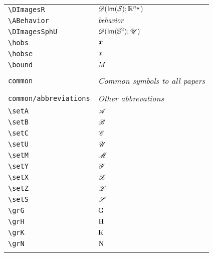 \begin{longtable}{lll}
 {\color[rgb]{0.5,0.5,0.5}\texttt{\textbackslash DImagesR}} & $\DImagesR$ & \\ 
 {\color[rgb]{0.5,0.5,0.5}\texttt{\textbackslash ABehavior}} & $\textit{behavior}$ & \\ 
 {\color[rgb]{0.5,0.5,0.5}\texttt{\textbackslash DImagesSphU}} & $\mathscr{D}(\mathsf{Im}(\mathbb{S}^2);\mathscr{U})$ & \\ 
 {\color[rgb]{0.5,0.5,0.5}\texttt{\textbackslash hobs}} & $\boldsymbol{x}$ & \\ 
 {\color[rgb]{0.5,0.5,0.5}\texttt{\textbackslash hobse}} & $x$ & \\ 
 {\color[rgb]{0.5,0.5,0.5}\texttt{\textbackslash bound}} & $M$ & \\ 
  &  & \\ 
 {\color[rgb]{0.5,0.5,0.5}\texttt{common}} & \multicolumn{2}{l}{\emph{Common symbols to all papers}}\\ 
 \hline
\hline
 &  & \\ 
 {\color[rgb]{0.5,0.5,0.5}\texttt{common/abbreviations}} & \multicolumn{2}{l}{\emph{Other abbrevations}}\\ 
 \hline
{\color[rgb]{0.5,0.5,0.5}\texttt{\textbackslash setA}} & $\mathscr{A}$ & \\ 
 {\color[rgb]{0.5,0.5,0.5}\texttt{\textbackslash setB}} & $\mathscr{B}$ & \\ 
 {\color[rgb]{0.5,0.5,0.5}\texttt{\textbackslash setC}} & $\mathscr{C}$ & \\ 
 {\color[rgb]{0.5,0.5,0.5}\texttt{\textbackslash setU}} & $\mathscr{U}$ & \\ 
 {\color[rgb]{0.5,0.5,0.5}\texttt{\textbackslash setM}} & $\mathscr{M}$ & \\ 
 {\color[rgb]{0.5,0.5,0.5}\texttt{\textbackslash setY}} & $\mathscr{Y}$ & \\ 
 {\color[rgb]{0.5,0.5,0.5}\texttt{\textbackslash setX}} & $\mathscr{X}$ & \\ 
 {\color[rgb]{0.5,0.5,0.5}\texttt{\textbackslash setZ}} & $\mathscr{Z}$ & \\ 
 {\color[rgb]{0.5,0.5,0.5}\texttt{\textbackslash setS}} & $\mathscr{S}$ & \\ 
 {\color[rgb]{0.5,0.5,0.5}\texttt{\textbackslash grG}} & $\mathrm{G}$ & \\ 
 {\color[rgb]{0.5,0.5,0.5}\texttt{\textbackslash grH}} & $\mathrm{H}$ & \\ 
 {\color[rgb]{0.5,0.5,0.5}\texttt{\textbackslash grK}} & $\mathrm{K}$ & \\ 
 {\color[rgb]{0.5,0.5,0.5}\texttt{\textbackslash grN}} & $\mathrm{N}$ & \\ 
  &  & \\ 

\end{longtable}

